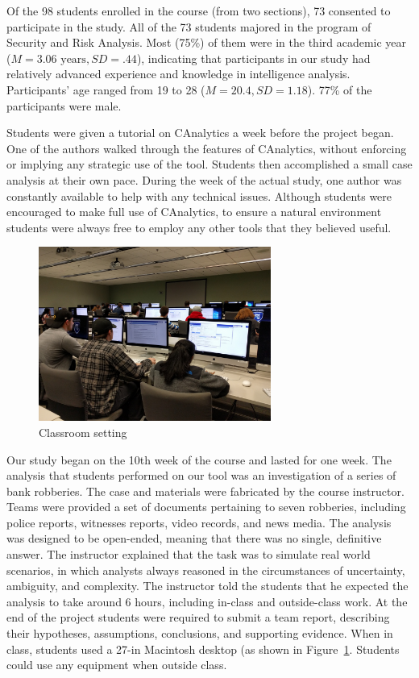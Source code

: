  Of the 98 students enrolled in the course (from
 two sections), 73 consented to participate in the study. All of the 73 students
 majored in the program of Security and Risk Analysis. Most (75\%) of them
 were in the third academic year ($M=3.06 \text{ years}, SD=.44$), indicating that participants in
 our study had relatively advanced experience and knowledge in intelligence
 analysis. Participants' age ranged from 19 to 28 ($M=20.4, SD=1.18$). 77\% of the
 participants were male.

 Students were given a tutorial on CAnalytics a week before the project began.
 One of the authors walked through the features of CAnalytics, without enforcing or implying any strategic use of the tool. Students then accomplished a small case analysis at their own pace. During the week of the
 actual study, one author was constantly available to help with any technical
 issues. Although students were encouraged to make full use of CAnalytics, to
 ensure a natural environment students were always free to employ any other
 tools that they believed useful.

 \begin{figure}
 	\centering
 	\includegraphics[width=3in]{04-Study_one/img/classroom_setting.jpg}
  \caption{Classroom setting}\label{fig:classroom}
 \end{figure}

Our study began on the 10th week of the course and lasted for one week. The
analysis that students performed on our tool was an investigation of a series
of bank robberies. The case and materials were fabricated by the course instructor. Teams
were provided a set of documents pertaining to seven robberies, including police
reports, witnesses reports, video records, and news media. The analysis was
designed to be open-ended, meaning that there was no single, definitive answer.
The instructor explained that the task was to simulate real world scenarios, in
which analysts always reasoned in the circumstances of uncertainty, ambiguity,
and complexity. The instructor told the students that he expected the analysis
to take around 6 hours, including in-class and outside-class work. At the end of
the project students were required to submit a team report, describing their
hypotheses, assumptions, conclusions, and supporting evidence. When in class, students used a 27-in Macintosh desktop (as shown in Figure~\ref{fig:classroom}. Students could use any equipment when outside class.

